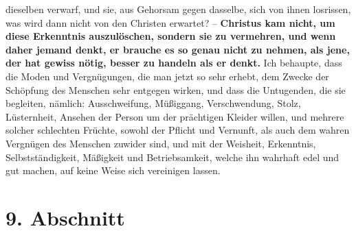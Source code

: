 dieselben verwarf, und sie, aus Gehorsam gegen dasselbe, sich von ihnen
losrissen, was wird dann nicht von den Christen erwartet? --
\label{ref:14_08_wahre_nachfolger_rational}
\textbf{Christus kam nicht,
um diese Erkenntnis auszulöschen, sondern sie zu vermehren, und wenn daher
jemand denkt, er brauche es so genau nicht zu nehmen, als jene, der hat gewiss
nötig, besser zu handeln als er denkt.} Ich behaupte, dass die Moden und
Vergnügungen, die man jetzt so sehr erhebt, dem Zwecke der Schöpfung des
Menschen sehr entgegen wirken, und dass die Untugenden, die sie begleiten,
nämlich: Ausschweifung, Müßiggang,
Verschwendung, Stolz, Lüsternheit, Ansehen
der Person um der prächtigen Kleider willen, und mehrere solcher schlechten
Früchte, sowohl der Pflicht und Vernunft, als auch dem wahren Vergnügen des
Menschen zuwider sind, und mit der Weisheit, Erkenntnis, Selbstständigkeit,
Mäßigkeit und Betriebsamkeit, welche ihn wahrhaft edel und gut
machen, auf keine
Weise sich vereinigen lassen.

\section{9. Abschnitt} \label{kap14_ab9}

